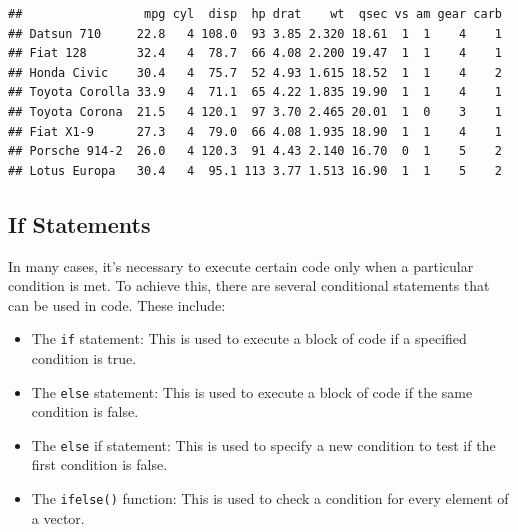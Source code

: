\documentclass[
  12pt,
  oneside]{book}
\newenvironment{Shaded}{\begin{snugshade}}{\end{snugshade}}
\newcommand{\DecValTok}[1]{\textcolor[rgb]{0.00,0.00,0.81}{#1}}
\newcommand{\FunctionTok}[1]{\textcolor[rgb]{0.00,0.00,0.00}{#1}}
\newcommand{\NormalTok}[1]{#1}
\newcommand{\SpecialCharTok}[1]{\textcolor[rgb]{0.00,0.00,0.00}{#1}}
\providecommand{\tightlist}{%
  \setlength{\itemsep}{0pt}\setlength{\parskip}{0pt}}
\theoremstyle{definition}
\theoremstyle{definition}
\theoremstyle{definition}
\theoremstyle{definition}
\theoremstyle{remark}
\begin{document}
\begin{Shaded}
\end{Shaded}

\begin{verbatim}
##                 mpg cyl  disp  hp drat    wt  qsec vs am gear carb
## Datsun 710     22.8   4 108.0  93 3.85 2.320 18.61  1  1    4    1
## Fiat 128       32.4   4  78.7  66 4.08 2.200 19.47  1  1    4    1
## Honda Civic    30.4   4  75.7  52 4.93 1.615 18.52  1  1    4    2
## Toyota Corolla 33.9   4  71.1  65 4.22 1.835 19.90  1  1    4    1
## Toyota Corona  21.5   4 120.1  97 3.70 2.465 20.01  1  0    3    1
## Fiat X1-9      27.3   4  79.0  66 4.08 1.935 18.90  1  1    4    1
## Porsche 914-2  26.0   4 120.3  91 4.43 2.140 16.70  0  1    5    2
## Lotus Europa   30.4   4  95.1 113 3.77 1.513 16.90  1  1    5    2
\end{verbatim}

\hypertarget{if-statements}{%
\subsection{If Statements}\label{if-statements}}

In many cases, it's necessary to execute certain code only when a particular condition is met. To achieve this, there are several conditional statements that can be used in code. These include:

\begin{itemize}
\tightlist
\item
  The \texttt{if} statement: This is used to execute a block of code if a specified condition is true.
\item
  The \texttt{else} statement: This is used to execute a block of code if the same condition is false.
\item
  The \texttt{else} if statement: This is used to specify a new condition to test if the first condition is false.
\item
  The \texttt{ifelse()} function: This is used to check a condition for every element of a vector.
\end{itemize}
\end{document}
